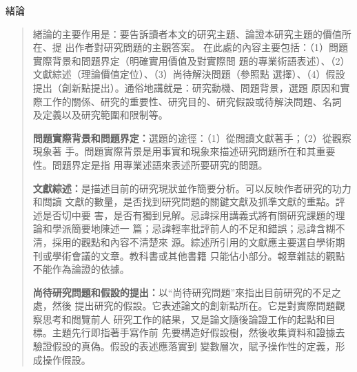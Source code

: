 \documentclass[
    writingLanguage=chinese, %
    addPageTitle=on,  %
    addDeclaration=on, %
    addMUSTlogo=on, %
    addFigTOC=on, %
    addTabTOC=on, %
    refIndent=off, %
    printMod=off, %
]{.def/must}
\begin{document}
\noindent\faHandORight 緒論
\begin{quote}
緒論的主要作用是：要告訴讀者本文的研究主題、論證本研究主題的價值所在、提
出作者對研究問題的主觀答案。
在此處的內容主要包括：（1）問題實際背景和問題界定（明確實用價值及對實際問
題的專業術語表述）、（2）文獻綜述（理論價值定位）、（3）尚待解決問題（參照點
選擇）、（4）假設提出（創新點提出）。通俗地講就是：研究動機、問題背景，選題
原因和實際工作的關係、研究的重要性、研究目的、研究假設或待解決問題、名詞
及定義以及研究範圍和限制等。

\textbf{問題實際背景和問題界定：}選題的途徑：（1）從閲讀文獻著手；（2）從觀察現象著
手。問題實際背景是用事實和現象來描述研究問題所在和其重要性。問題界定是指
用專業述語來表述所要研究的問題。

\textbf{文獻綜述：}是描述目前的研究現狀並作簡要分析。可以反映作者研究的功力和閲讀
文獻的數量，是否找到研究問題的關鍵文獻及抓準文獻的重點。評述是否切中要
害，是否有獨到見解。忌諱採用講義式將有關研究課題的理論和學派簡要地陳述一
篇；忌諱輕率批評前人的不足和錯誤；忌諱含糊不清，採用的觀點和內容不清楚來
源。綜述所引用的文獻應主要選自學術期刊或學術會議的文章。教科書或其他書籍
只能佔小部分。報章雜誌的觀點不能作為論證的依據。

\textbf{尚待研究問題和假設的提出：}以“尚待研究問題”來指出目前研究的不足之處，然後
提出研究的假設。它表述論文的創新點所在。它是對實際問題觀察思考和閲覽前人
研究工作的結果，又是論文隨後論證工作的起點和目標。主題先行即指著手寫作前
先要構造好假設樹，然後收集資料和證據去驗證假設的真偽。假設的表述應落實到
變數層次，賦予操作性的定義，形成操作假設。

\end{quote}
\end{document}
